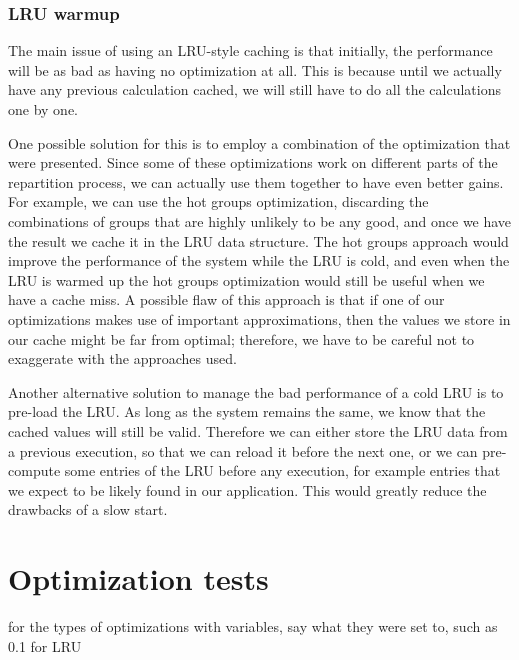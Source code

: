 \subsubsection{LRU warmup}\label{sec:warmup}
The main issue of using an LRU-style caching is that initially, the performance will be as bad as having no optimization at all. This is because until we actually have any previous calculation cached, we will still have to do all the calculations one by one. 

One possible solution for this is to employ a combination of the optimization that were presented. Since some of these optimizations work on different parts of the repartition process, we can actually use them together to have even better gains. For example, we can use the hot groups optimization, discarding the combinations of groups that are highly unlikely to be any good, and once we have the result we cache it in the LRU data structure. The hot groups approach would improve the performance of the system while the LRU is cold, and even when the LRU is warmed up the hot groups optimization would still be useful when we have a cache miss. A possible flaw of this approach is that if one of our optimizations makes use of important approximations, then the values we store in our cache might be far from optimal; therefore, we have to be careful not to exaggerate with the approaches used.

Another alternative solution to manage the bad performance of a cold LRU is to pre-load the LRU. As long as the system remains the same, we know that the cached values will still be valid. Therefore we can either store the LRU data from a previous execution, so that we can reload it before the next one, or we can pre-compute some entries of the LRU before any execution, for example entries that we expect to be likely found in our application. This would greatly reduce the drawbacks of a slow start.


\section{Optimization tests}\label{sec:optimization-tests}
for the types of optimizations with variables, say what they were set to, such as 0.1 for LRU
